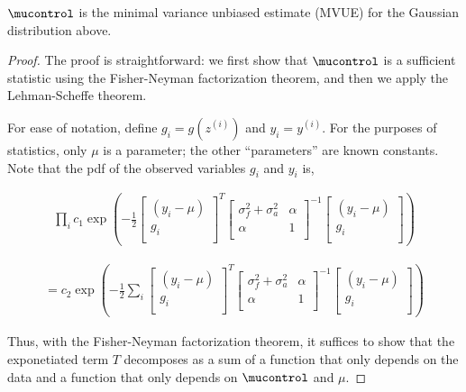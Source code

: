 \begin{lemma}
\label{lem:mvue}
$\mucontrol$ is the minimal variance unbiased estimate (MVUE) for the Gaussian distribution above.
\end{lemma}
\begin{proof}
The proof is straightforward: we first show that $\mucontrol$ is a sufficient statistic using the Fisher-Neyman factorization theorem, and then we apply the Lehman-Scheffe theorem.

For ease of notation, define $g_i = g(z^{(i)})$ and $y_i = y^{(i)}$. For the purposes of statistics, only $\mu$ is a parameter; the other ``parameters'' are known constants. %
Note that the pdf of the observed variables $g_i$ and $y_i$ is,

\begin{align}
\prod_i c_1 \exp(-\frac{1}{2} 
\begin{bmatrix}
(y_i - \mu) \\
g_i \\
\end{bmatrix}^T
\begin{bmatrix}
\sigma^2_f + \sigma^2_a & \alpha \\
\alpha & 1 \\
\end{bmatrix}^{-1}
\begin{bmatrix}
(y_i - \mu) \\
g_i \\
\end{bmatrix})
\end{align}

\begin{align}
=c_2 \exp(-\frac{1}{2} \sum_i
\begin{bmatrix}
(y_i - \mu) \\
g_i \\
\end{bmatrix}^T
\begin{bmatrix}
\sigma^2_f + \sigma^2_a & \alpha \\
\alpha & 1 \\
\end{bmatrix}^{-1}
\begin{bmatrix}
(y_i - \mu) \\
g_i \\
\end{bmatrix})
\end{align}

Thus, with the Fisher-Neyman factorization theorem, it suffices to show that the exponetiated term $T$ decomposes as a sum of a function that only depends on the data and a function that only depends on $\mucontrol$ and $\mu$.


\end{proof}
